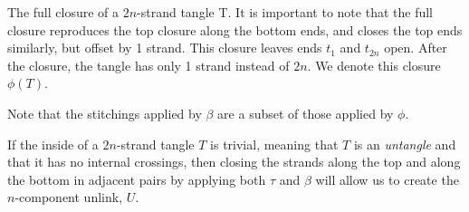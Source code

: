 \begin{paper}
{The full closure of a $2n$-strand tangle T.
It is important to note that the full closure reproduces the top closure along
the bottom ends, and closes the top ends similarly, but offset by 1 strand.
This closure leaves ends $t_1$ and $t_{2n}$ open.
After the closure, the tangle has only 1 strand instead of $2n$.
We denote this closure $\phi(T)$.}


Note that the stitchings applied by $\beta$ are a subset of those applied by
$\phi$.

If the inside of a $2n$-strand tangle $T$ is trivial, meaning that $T$ is an
\textit{untangle} and that it has no internal crossings, then closing the
strands along the top and along the bottom in adjacent pairs by applying both
$\tau$ and $\beta$ will allow us to create the $n$-component unlink, $U$.

\begin{paperwhere}
\end{paperwhere}


\end{paper}
